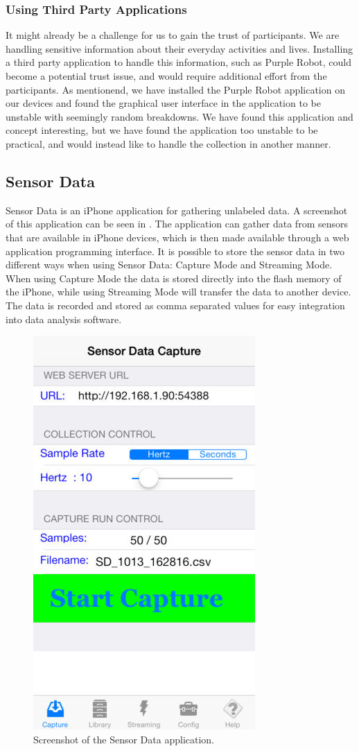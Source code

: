 \subsubsection{Using Third Party Applications}
It might already be a challenge for us to gain the trust of participants. We are handling sensitive information about their everyday activities and lives. Installing a third party application to handle this information, such as Purple Robot, could become a potential trust issue, and would require additional effort from the participants. As mentionend, we have installed the Purple Robot application on our devices and found the graphical user interface in the application to be unstable with seemingly random breakdowns. We have found this application and concept interesting, but we have found the application too unstable to be practical, and would instead like to handle the collection in another manner. 

\subsection{Sensor Data}
\label{sub:sensor_data}
Sensor Data is an iPhone application for gathering unlabeled data. A screenshot of this application can be seen in . The application can gather data from sensors that are available in iPhone devices, which is then made available through a web application programming interface. It is possible to store the sensor data in two different ways when using Sensor Data: Capture Mode and Streaming Mode. When using Capture Mode the data is stored directly into the flash memory of the iPhone, while using Streaming Mode will transfer the data to another device. The data is recorded and stored as comma separated values for easy integration into data analysis software.

\begin{figure}[!htbp]
	\centering
	\includegraphics[height=0.5\textwidth]{graphic/existing_solutions/sensor_data}
	\caption[]{Screenshot of the Sensor Data application\parencite{sensor_data_app_itunes}.}
	\label{fig:sensor_data_screenshot}
\end{figure}
\FloatBarrier

